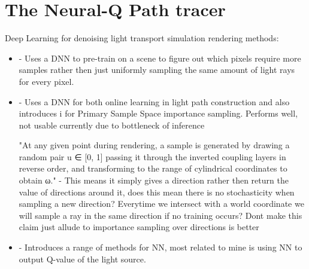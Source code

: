 \documentclass[ %
                    author={Callum Pearce},
                supervisor={Dr. Neill Campbell},
                    degree={MEng},
                     title={How effective are Temporal difference learning methods for reducing the number of zero contribution light paths, while still accurately approximating Global Illumination in Path tracing?},
                  subtitle={},
                      type={research},
                      year={2019} ]{dissertation}
\begin{document}

\chapter{The Neural-Q Path tracer}
\label{chap:deep-q}


Deep Learning for denoising light transport simulation rendering methods:
\begin{itemize}
\item \cite{zheng2018learning} - Uses a DNN to pre-train on a scene to figure out which pixels require more samples rather then just uniformly sampling the same amount of light rays for every pixel.

\item \cite{muller2018neural} - Uses a DNN for both online learning in light path construction and also introduces i for Primary Sample Space importance sampling. Performs well, not usable currently due to bottleneck of inference

"At any given point during rendering, a sample is generated by drawing a random pair u ∈ [0, 1] passing it through the inverted coupling layers in reverse order, and transforming to the range of cylindrical coordinates to obtain ω." - This means it simply gives a direction rather then return the value of directions around it, does this mean there is no stochasticity when sampling a new direction? Everytime we intersect with a world coordinate we will sample a ray in the same direction if no training occurs? Dont make this claim just allude to importance sampling over directions is better

\item \cite{keller2019integral} - Introduces a range of methods for NN, most related to mine is using NN to output Q-value of the light source.
\end{itemize}
\end{document}
